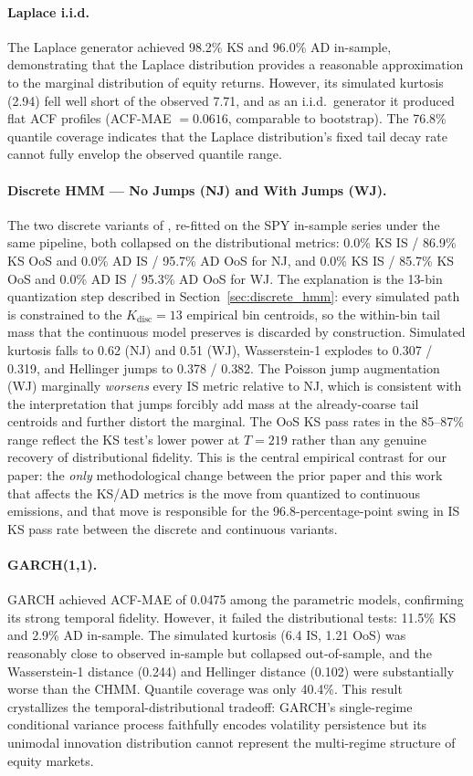 \paragraph{Laplace i.i.d.}
The Laplace generator achieved 98.2\% KS and 96.0\% AD in-sample, demonstrating that the Laplace distribution provides a reasonable approximation to the marginal distribution of equity returns.
However, its simulated kurtosis (2.94) fell well short of the observed 7.71, and as an i.i.d.\ generator it produced flat ACF profiles (ACF-MAE $= 0.0616$, comparable to bootstrap).
The 76.8\% quantile coverage indicates that the Laplace distribution's fixed tail decay rate cannot fully envelop the observed quantile range.

\paragraph{Discrete HMM --- No Jumps (NJ) and With Jumps (WJ).}
The two discrete variants of \citet{alswaidan2026hybrid}, re-fitted on the SPY in-sample series under the same pipeline, both collapsed on the distributional metrics: 0.0\% KS IS / 86.9\% KS OoS and 0.0\% AD IS / 95.7\% AD OoS for NJ, and 0.0\% KS IS / 85.7\% KS OoS and 0.0\% AD IS / 95.3\% AD OoS for WJ.
The explanation is the 13-bin quantization step described in Section~\ref{sec:discrete_hmm}: every simulated path is constrained to the $K_{\text{disc}} = 13$ empirical bin centroids, so the within-bin tail mass that the continuous model preserves is discarded by construction.
Simulated kurtosis falls to 0.62 (NJ) and 0.51 (WJ), Wasserstein-1 explodes to 0.307 / 0.319, and Hellinger jumps to 0.378 / 0.382.
The Poisson jump augmentation (WJ) marginally \emph{worsens} every IS metric relative to NJ, which is consistent with the interpretation that jumps forcibly add mass at the already-coarse tail centroids and further distort the marginal.
The OoS KS pass rates in the 85--87\% range reflect the KS test's lower power at $T = 219$ rather than any genuine recovery of distributional fidelity.
This is the central empirical contrast for our paper: the \emph{only} methodological change between the prior paper and this work that affects the KS/AD metrics is the move from quantized to continuous emissions, and that move is responsible for the 96.8-percentage-point swing in IS KS pass rate between the discrete and continuous variants.

\paragraph{GARCH(1,1).}
GARCH achieved ACF-MAE of 0.0475 among the parametric models, confirming its strong temporal fidelity.
However, it failed the distributional tests: 11.5\% KS and 2.9\% AD in-sample.
The simulated kurtosis (6.4 IS, 1.21 OoS) was reasonably close to observed in-sample but collapsed out-of-sample, and the Wasserstein-1 distance (0.244) and Hellinger distance (0.102) were substantially worse than the CHMM.
Quantile coverage was only 40.4\%.
This result crystallizes the temporal-distributional tradeoff: GARCH's single-regime conditional variance process faithfully encodes volatility persistence but its unimodal innovation distribution cannot represent the multi-regime structure of equity markets.

